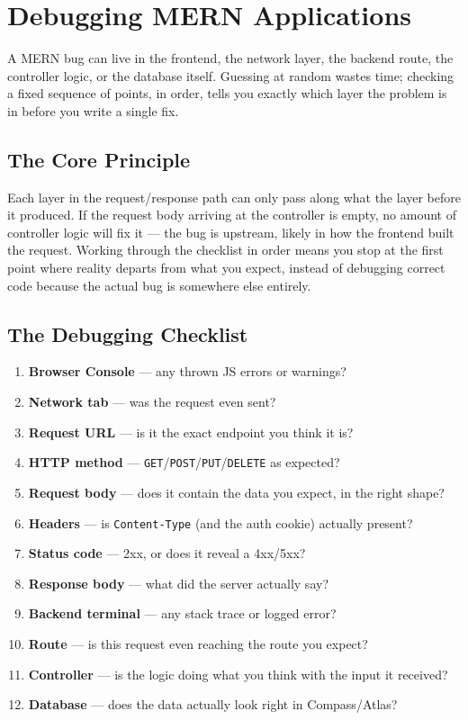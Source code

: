 \chapter{Debugging MERN Applications}

A MERN bug can live in the frontend, the network layer, the backend route,
the controller logic, or the database itself. Guessing at random wastes
time; checking a fixed sequence of points, in order, tells you exactly
which layer the problem is in before you write a single fix.

\section{The Core Principle}

Each layer in the request/response path can only pass along what the layer
before it produced. If the request body arriving at the controller is
empty, no amount of controller logic will fix it --- the bug is upstream,
likely in how the frontend built the request. Working through the
checklist in order means you stop at the first point where reality departs
from what you expect, instead of debugging correct code because the actual
bug is somewhere else entirely.

\section{The Debugging Checklist}

\begin{enumerate}
\item \textbf{Browser Console} --- any thrown JS errors or warnings?
\item \textbf{Network tab} --- was the request even sent?
\item \textbf{Request URL} --- is it the exact endpoint you think it is?
\item \textbf{HTTP method} --- \texttt{GET}/\texttt{POST}/\texttt{PUT}/\texttt{DELETE} as expected?
\item \textbf{Request body} --- does it contain the data you expect, in the right shape?
\item \textbf{Headers} --- is \texttt{Content-Type} (and the auth cookie) actually present?
\item \textbf{Status code} --- 2xx, or does it reveal a 4xx/5xx?
\item \textbf{Response body} --- what did the server actually say?
\item \textbf{Backend terminal} --- any stack trace or logged error?
\item \textbf{Route} --- is this request even reaching the route you expect?
\item \textbf{Controller} --- is the logic doing what you think with the input it received?
\item \textbf{Database} --- does the data actually look right in Compass/Atlas?
\end{enumerate}

